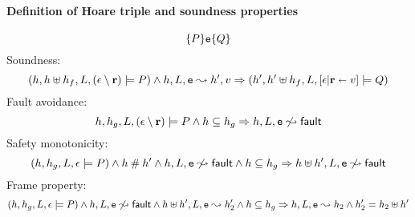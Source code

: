 \documentclass[a4paper,notitlepage]{report}
\begin{document}
\paragraph{Definition of Hoare triple and soundness properties}
\[ \{P\}\mathtt{e}\{Q\} \]
Soundness:
\[ (h, h \uplus h_f, L, (\epsilon\setminus{\ensuremath{\mathrm{\textbf{r}}}}) \models P) \land h, L, \mathtt{e} \leadsto h', v
  \Rightarrow (h', h' \uplus h_f, L, [\epsilon|{\mathrm{\textbf{r}}}\shortleftarrow v] \models Q) \]
Fault avoidance:
\[ h, h_g, L, (\epsilon\setminus{\ensuremath{\mathrm{\textbf{r}}}}) \models P \land h\subseteq h_g \Rightarrow h, L, \mathtt{e} \not\leadsto {\ensuremath{\mathsf{fault}}} \]
Safety monotonicity:
\[ (h, h_g, L, \epsilon \models P) \land h \mathbin{\#} h' \land h, L, \mathtt{e} \not\leadsto
  {\ensuremath{\mathsf{fault}}} \land h\subseteq h_g \Rightarrow h \uplus h', L, \mathtt{e} \not\leadsto {\ensuremath{\mathsf{fault}}} \]
Frame property:
\[ (h, h_g, L, \epsilon \models P) \land h, L, \mathtt{e} \not\leadsto {\ensuremath{\mathsf{fault}}} \land
  h \uplus h', L, \mathtt{e} \leadsto h_2' \land h\subseteq h_g\Rightarrow h, L, \mathtt{e} \leadsto h_2 \land
  h_2' = h_2 \uplus h' \]
\end{document}
